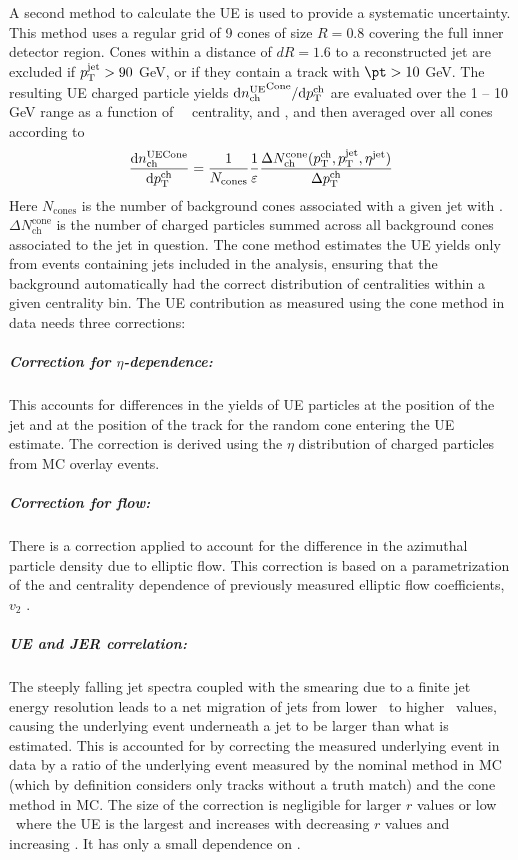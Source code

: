 A second method to calculate the UE is used to provide a systematic uncertainty. This method uses a regular grid of 9 cones of size $R = 0.8$ covering the full inner detector region. Cones within a distance of $dR=1.6$ to a reconstructed jet are excluded if $\mbox{$p_{\mathrm{T}}^{\mathrm{jet}}$} > 90$ GeV, or if they contain a track with $\pt > 10$ GeV. The resulting UE charged particle yields $\mathrm{d} \mbox{$n_{\mathrm{ch}}^{\mathrm{UE}}$}^{\mathrm{Cone}}/ \mathrm{d} \mbox{$p_{{\mathrm{T}}}^{\mathrm{ch}}$}$ are evaluated over the 1 -- 10 GeV range as a function of \pt\, \ptjet\, centrality, and \rvar, and then averaged over all cones according to
 \begin{eqnarray}
 \label{eq:Dptsub}
\frac{\mathrm{d} n_{\mathrm{ch}}^{\mathrm{UE Cone}}}{\mathrm{d} \mbox{$p_{{\mathrm{T}}}^{\mathrm{ch}}$}}  = \frac{1}{N_{\mathrm{cones}}} \frac{1}{\varepsilon} \frac{\Delta N^{\mathrm{cone}}_{\mathrm{ch}} (\mbox{$p_{{\mathrm{T}}}^{\mathrm{ch}}$}, \mbox{$p_{\mathrm{T}}^{\mathrm{jet}}$}, \mbox{$\eta^{\mathrm{jet}}$})}{\Delta \mbox{$p_{{\mathrm{T}}}^{\mathrm{ch}}$}}
 \end{eqnarray}
Here $N_{\mathrm{cones}}$ is the number of background cones associated with a given jet with \ptjet. $\Delta N^{\mathrm{cone}}_{\mathrm{ch}}$ is the number of charged particles summed across all background cones associated to the jet in question. The cone method estimates the UE yields only from events containing jets included in the analysis, ensuring that the background automatically had the correct distribution of centralities within a given centrality bin. The UE contribution as measured using the cone method in data needs three corrections:
 \subparagraph{Correction for $\eta$-dependence: } This accounts for differences in the yields of UE particles at the position of the jet and at the position of the track for the random cone entering the UE estimate. The correction is derived using the $\eta$ distribution of charged particles from MC overlay events.
 \subparagraph{Correction for flow: }  There is a correction applied to account for the difference in the azimuthal particle density due to elliptic flow. This correction is based on a parametrization of the \pTch and centrality dependence of previously measured elliptic flow coefficients, $v_{2}$ \cite{ATLAS-CONF-2016-105}.  
\subparagraph{UE and JER correlation: } The steeply falling jet spectra coupled with the smearing due to a finite jet energy resolution leads to a net migration of jets from lower \pt\ to higher \pt\ values, causing the underlying event underneath a jet to be larger than what is estimated. This is accounted for by correcting the measured underlying event in data by a ratio of the underlying event measured by the nominal method in MC (which by definition considers only tracks without a truth match) and the cone method in MC. The size of the correction is negligible for larger $r$ values or low \pttrk\ where the UE is the largest and increases with decreasing $r$ values and increasing \pttrk. It has only a small dependence on \ptjet. 

